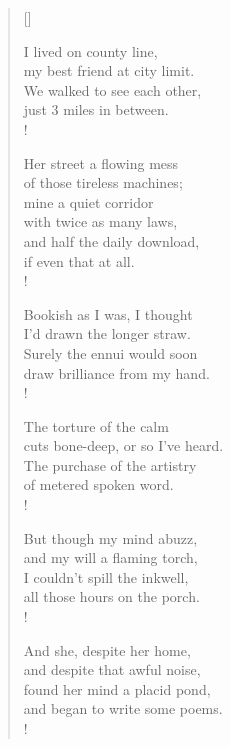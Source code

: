 \documentclass[12pt]{article}
\newcommand{\attrib}[1]{%
  \nopagebreak{\scshape\centering\footnotesize #1\par}
}
\begin{document}
{\selectfont{}}

\vspace{-0.5em}

\attrib{chris romano} 
\begin{multicols}{2}\settowidth{\versewidth}{\footnotesize 
 It was nothing like the way I wro}


 \begin{verse}[\versewidth]
            
I lived on county line, \\
my best friend at city limit. \\
We walked to see each other, \\
just 3 miles in between. \\!

Her street a flowing mess \\
of those tireless machines; \\
mine a quiet corridor \\
with twice as many laws, \\
and half the daily download, \\
if even that at all. \\!

Bookish as I was, I thought \\
I'd drawn the longer straw. \\
Surely the ennui would soon \\ 
draw brilliance from my hand. \\!

The torture of the calm \\
cuts bone-deep, or so I’ve heard. \\
The purchase of the artistry \\
of metered spoken word. \\!

But though my mind abuzz, \\
and my will a flaming torch, \\ 
I couldn’t spill the inkwell, \\
all those hours on the porch. \\!

And she, despite her home, \\
and despite that awful noise, \\
found her mind a placid pond, \\
and began to write some poems. \\!


\end{verse}
\end{multicols}
\end{document}
